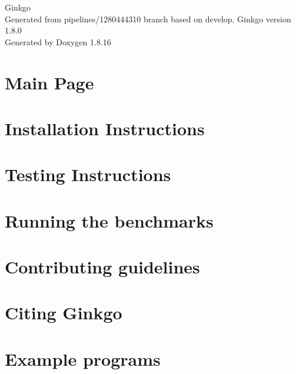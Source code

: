 \let\mypdfximage\pdfximage\def\pdfximage{\immediate\mypdfximage}\documentclass[twoside]{book}
\newcommand{\+}{\discretionary{\mbox{\scriptsize$\hookleftarrow$}}{}{}}
\newcommand{\clearemptydoublepage}{%
  \newpage{\pagestyle{empty}\cleardoublepage}%
}
\begin{document}
\hypersetup{pageanchor=false,
             bookmarksnumbered=true,
             pdfencoding=unicode
            }
\begin{titlepage}
\vspace*{7cm}
\begin{center}%
{\Large Ginkgo \\[1ex]\large Generated from pipelines/1280444310 branch based on develop. Ginkgo version 1.\+8.\+0 }\\
\vspace*{1cm}
{\large Generated by Doxygen 1.8.16}\\
\end{center}
\end{titlepage}
\clearemptydoublepage
{}
\tableofcontents
\clearemptydoublepage
{}
\hypersetup{pageanchor=true}

\chapter{Main Page}
\label{index}\hypertarget{index}{}
\chapter{Installation Instructions}
\label{install_ginkgo}

\chapter{Testing Instructions}
\label{testing_ginkgo}

\chapter{Running the benchmarks}
\label{benchmarking_ginkgo}

\chapter{Contributing guidelines}
\label{contributing_guidelines}

\chapter{Citing Ginkgo}
\label{citing_ginkgo}

\chapter{Example programs}
\label{Examples}

\end{document}
